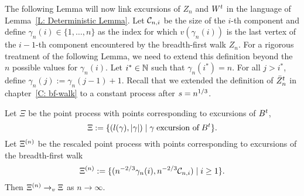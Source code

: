 The following Lemma will now link excursions of $Z_n$ and $W^t$ in the language of Lemma~\ref{L: Deterministic Lemma}.
Let $\mathcal{C}_{n,i}$ be the size of the $i$-th component and
define $\gamma_n(i) \in \{1, \dots, n\}$ as the index for which
$v(\gamma_n(i))$ is the last vertex of the $i-1$-th component encountered by the breadth-first walk $Z_n$.
For a rigorous treatment of the following Lemma, we need to extend this definition beyond the $n$ possible values for $\gamma_n(i)$.
Let $i^* \in \mathbb{N}$ such that $\gamma_n(i^*) = n$. For all $j > i^*$, define $\gamma_n(j) := \gamma_n(j-1) + 1$.
Recall that we extended the definition of $\bar{Z}^t_n$ in chapter~\ref{C: bf-walk} to a constant process after $s=n^{1 / 3}$.

\begin{lemma} \label{L: Lemma 8}
	Let $\Xi$ be the point process with points corresponding to excursions of $B^t$,
	\begin{equation} \label{E: Lemma 8 def Xi}
	\Xi := \{ (l(\gamma), |\gamma|) \; | \; \gamma \; \text{excursion of} \; B^t \}.
	\end{equation}
	Let $\Xi^{(n)}$ be the rescaled point process with points corresponding to excursions of the breadth-first walk
	\begin{equation} \label{E: Lemma 8 def Xin}
	\Xi^{(n)} := \{ ( n^{-2 / 3} \gamma_n(i), n^{-2 / 3} \mathcal{C}_{n,i} ) \; | \; i \geq 1 \}.
	\end{equation}
	Then $\Xi^{(n)} \rightarrow_v \Xi$ as $n \rightarrow \infty$.
\end{lemma}

